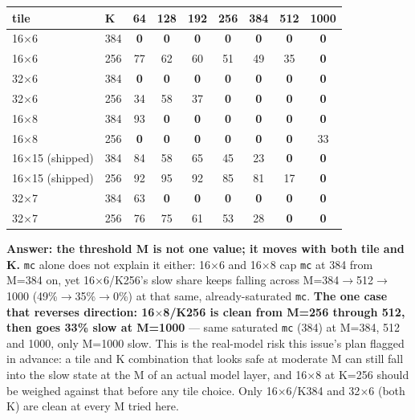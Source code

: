 \documentclass[10pt,a4paper]{article}
\newcommand{\up}[1]{\textcolor{red!70!black}{#1}}
\newcommand{\good}[1]{\textcolor{green!45!black}{\textbf{#1}}}
\begin{document}
\begin{center}\footnotesize\setlength{\tabcolsep}{3pt}
\begin{tabular}{@{}llccccccc@{}}
\toprule
tile & K & 64 & 128 & 192 & 256 & 384 & 512 & 1000 \\
\midrule
16$\times$6 & 384 & \good{0} & \good{0} & \good{0} & \good{0} & \good{0} & \good{0} & \good{0} \\
16$\times$6 & 256 & \up{77} & \up{62} & \up{60} & \up{51} & \up{49} & \up{35} & \good{0} \\
32$\times$6 & 384 & \good{0} & \good{0} & \good{0} & \good{0} & \good{0} & \good{0} & \good{0} \\
32$\times$6 & 256 & \up{34} & \up{58} & \up{37} & \good{0} & \good{0} & \good{0} & \good{0} \\
16$\times$8 & 384 & \up{93} & \good{0} & \good{0} & \good{0} & \good{0} & \good{0} & \good{0} \\
16$\times$8 & 256 & \good{0} & \good{0} & \good{0} & \good{0} & \good{0} & \good{0} & \up{33} \\
16$\times$15 (shipped) & 384 & \up{84} & \up{58} & \up{65} & \up{45} & \up{23} & \good{0} & \good{0} \\
16$\times$15 (shipped) & 256 & \up{92} & \up{95} & \up{92} & \up{85} & \up{81} & \up{17} & \good{0} \\
32$\times$7 & 384 & \up{63} & \good{0} & \good{0} & \good{0} & \good{0} & \good{0} & \good{0} \\
32$\times$7 & 256 & \up{76} & \up{75} & \up{61} & \up{53} & \up{28} & \good{0} & \good{0} \\
\bottomrule
\end{tabular}
\end{center}
\textbf{Answer: the threshold M is not one value; it moves with both tile and K.} \texttt{mc} alone does not explain
it either: 16$\times$6 and 16$\times$8 cap \texttt{mc} at 384 from M=384 on, yet 16$\times$6/K256's slow share keeps
falling across M=384$\to$512$\to$1000 (49\%$\to$35\%$\to$0\%) at that same, already-saturated \texttt{mc}.
\textbf{The one case that reverses direction: 16$\times$8/K256 is clean from M=256 through 512, then goes
\up{33\% slow at M=1000}} --- same saturated \texttt{mc} (384) at M=384, 512 and 1000, only M=1000 slow. This is the
real-model risk this issue's plan flagged in advance: a tile and K combination that looks safe at moderate M can still
fall into the slow state at the M of an actual model layer, and 16$\times$8 at K=256 should be weighed against that
before any tile choice. Only 16$\times$6/K384 and 32$\times$6 (both K) are clean at every M tried here.
\end{document}
